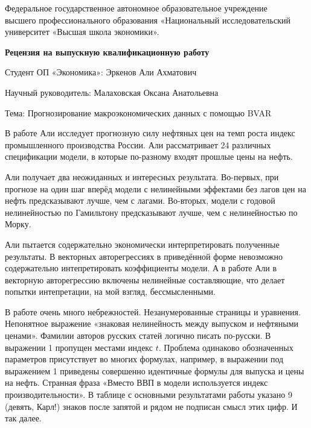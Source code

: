 \documentclass[a4paper, 12pt]{article}
\begin{document}
\begin{center}
{\small Федеральное государственное автономное образовательное учреждение\\ 
высшего профессионального образования «Национальный исследовательский\\ 
университет «Высшая школа экономики».}
\end{center}

\vspace{0.4cm}

\begin{center}
\textbf{Рецензия на выпускную квалификационную работу}
\end{center}

\vspace{0.4cm}

Студент ОП «Экономика»: Эркенов Али Ахматович

\vspace{0.4cm}

Научный руководитель: Малаховская Оксана Анатольевна

\vspace{0.4cm}

Тема: Прогнозирование макроэкономических данных с помощью BVAR

\vspace{0.4cm}

В работе Али исследует прогнозную силу нефтяных цен на темп роста индекс
промышленного производства России. Али рассматривает 24 различных
спецификации модели, в которые по-разному входят прошлые цены на нефть.

Али получает два неожиданных и интересных результата. Во-первых, при
прогнозе на один шаг вперёд модели с нелинейными эффектами без лагов цен
на нефть предсказывают лучше, чем с лагами. Во-вторых, модели с годовой
нелинейностью по Гамильтону предсказывают лучше, чем с нелинейностью по
Морку.

Али пытается содержательно экономически интерпретировать полученные
результаты. В векторных авторегрессиях в приведённой форме невозможно
содержательно интепретировать коэффициенты модели. А в работе Али в
векторную авторегрессию включены нелинейные составляющие, что делает
попытки интепретации, на мой взгляд, бессмысленными.

В работе очень много небрежностей. Незанумерованные страницы и
уравнения. Непонятное выражение «знаковая нелинейность между выпуском и
нефтяными ценами». Фамилии авторов русских статей логично писать
по-русски. В выражении 1 пропущен местами индекс \(t\). Проблема
одинаково обозначенных параметров присутствует во многих формулах,
например, в выражении под выражением 1 приведены совершенно идентичные
формулы для выпуска и цены на нефть. Странная фраза «Вместо ВВП в модели
используется индекс производительности». В таблице с основными
результатами работы указано 9 (девять, Карл!) знаков после запятой и
рядом не подписан смысл этих цифр. И так далее.
\end{document}
